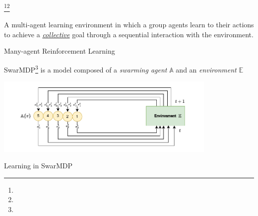\documentclass[presentation, 8pt,169]{beamer}\mode<presentation>{\usetheme{AMSBolognaFC}}
\begin{document}
\begin{frame}[plain]
  \begin{center}
\huge{\footnote{\tiny{}}}\footnote{\tiny{}}
  \end{center}
  \begin{center}
    \large{A multi-agent learning environment in which a  group agents learn to  their actions to achieve a \emph{\underline{collective}} goal through a sequential interaction with the environment}.
  \end{center}
\end{frame} 
\begin{frame}{Many-agent Reinforcement Learning}

SwarMDP\footnote{} is a model composed of a \emph{swarming agent} $\mathbb{A}$ and an \emph{environment} $\mathbb{E}$
\begin{center}
\includegraphics[width=0.8\textwidth]{img/swarmdp.drawio.pdf}
\end{center}
\begin{block}{Learning in SwarMDP}
  \begin{itemize}

\end{itemize}
\end{block}
\end{frame}
\end{document}
